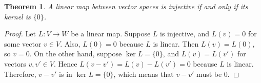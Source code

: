 \documentclass[12pt]{article}
\newtheorem*{thm}{Theorem}
\begin{document}
\begin{thm} 
A linear map between vector spaces is injective if and only if its kernel is $\{0\}$. 
\end{thm}



\begin{proof} Let $L: V \to W$ be a linear map. Suppose $L$ is injective, and $L(v)=0$ for some vector
$v\in V$. Also, $L(0) =0$ because $L$ is linear. 
Then $L(v)=L(0)$,   so $v=0$. On the other hand, suppose
 $\operatorname{ker}L=\{0\}$, and $L(v)=L(v')$ for vectors $v,v'\in V$. 
Hence $L(v-v') = L(v)-L(v') = 0$ because $L$ is linear.
Therefore, $v-v'$ is in $\operatorname{ker}L=\{0\}$, which means that 
$v-v'$ must be $0$.
\end{proof}
\end{document}
